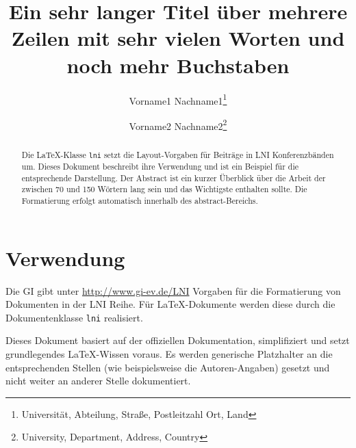 \documentclass[utf8,biblatex]{lni}
\begin{document}
\title[Ein Kurztitel]{Ein sehr langer Titel über mehrere Zeilen mit sehr vielen Worten und noch mehr Buchstaben}
\author[Vorname1 Nachname1 \and Vorname2 Nachname2]
{Vorname1 Nachname1\footnote{Universität, Abteilung, Straße, Postleitzahl Ort, Land } \and
 Vorname2 Nachname2\footnote{University, Department, Address, Country }}
\maketitle

\begin{abstract}
Die \LaTeX-Klasse \texttt{lni} setzt die Layout-Vorgaben für Beiträge in LNI Konferenzbänden um.
Dieses Dokument beschreibt ihre Verwendung und ist ein Beispiel für die entsprechende Darstellung.
Der Abstract ist ein kurzer Überblick über die Arbeit der zwischen 70 und 150 Wörtern lang sein und das Wichtigste enthalten sollte.
Die Formatierung erfolgt automatisch innerhalb des abstract-Bereichs.
\end{abstract}


\section{Verwendung}
Die GI gibt unter \url{http://www.gi-ev.de/LNI} Vorgaben für die Formatierung von Dokumenten in der LNI Reihe.
Für \LaTeX-Dokumente werden diese durch die Dokumentenklasse \texttt{lni} realisiert.

Dieses Dokument basiert auf der offiziellen Dokumentation, simplifiziert und setzt grundlegendes LaTeX-Wissen voraus.
Es werden generische Platzhalter an die entsprechenden Stellen (wie beispielsweise die Autoren-Angaben) gesetzt und nicht weiter an anderer Stelle dokumentiert.
\end{document}
